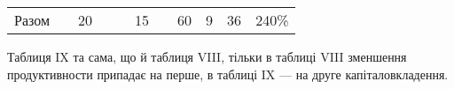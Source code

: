 \begin{table}[h]
\begin{center}
\begin{tabular}{c@{  } c@{  } c@{  } c@{  } c@{  } c@{  } c@{  } c@{  } c@{  } c@{  } с}
     \cmidrule(r){3-3}
     \cmidrule(l){6-6}
     \cmidrule(r){8-8}
     \cmidrule(r){9-9}
     \cmidrule(r){10-10}
     \cmidrule(r){11-11}

      Разом & & 20 & & & 15 & & 60 & 9 & 36 & 240\%\\
  \end{tabular}

  \end{center}
\end{table}

Таблиця IX та сама, що й таблиця VIII, тільки в таблиці VIII зменшення
продуктивности припадає на перше, в таблиці IX — на друге капіталовкладення.

